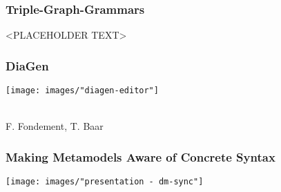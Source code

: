 \begin{frame}
  \frametitle{Triple-Graph-Grammars \footnotesize\cite{schurr_specification_1994}}
  \centering
  \huge 
  <PLACEHOLDER TEXT>
\end{frame}

\begin{frame}
  \frametitle{DiaGen \footnotesize\cite{minas_concepts_2002}}
  \centering
  \texttt{[image: images/"diagen-editor"]}
\end{frame}

\begin{frame}
  \hspace{-1cm}
  \large
   \\
  \hspace{-1cm}
  \small
  F. Fondement, T. Baar \cite{fondement_making_2005}
\end{frame}

\begin{frame}
  \frametitle{Making Metamodels Aware of Concrete Syntax}

  \centering
  \hspace{-1cm}
  \texttt{[image: images/"presentation - dm-sync"]}
\end{frame}




